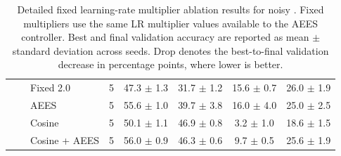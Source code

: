 \begin{table}[htbp]
{\begin{tabular}{lllccccc}
 &  & Fixed 2.0 & 5 & 47.3 $\pm$ 1.3 & 31.7 $\pm$ 1.2 & 15.6 $\pm$ 0.7 & 26.0 $\pm$ 1.9 \\
 &  & AEES & 5 & 55.6 $\pm$ 1.0 & 39.7 $\pm$ 3.8 & 16.0 $\pm$ 4.0 & 25.0 $\pm$ 2.5 \\
 &  & Cosine & 5 & 50.1 $\pm$ 1.1 & 46.9 $\pm$ 0.8 & 3.2 $\pm$ 1.0 & 18.6 $\pm$ 1.5 \\
 &  & Cosine + AEES & 5 & 56.0 $\pm$ 0.9 & 46.3 $\pm$ 0.6 & 9.7 $\pm$ 0.5 & 25.6 $\pm$ 1.9 \\
\bottomrule
\end{tabular}
}
\caption{Detailed fixed learning-rate multiplier ablation results for noisy \cifar{}. Fixed multipliers use the same LR multiplier values available to the AEES controller. Best and final validation accuracy are reported as mean $\pm$ standard deviation across seeds. Drop denotes the best-to-final validation decrease in percentage points, where lower is better.}
\label{tab:cifar_noisy_fixed_lr_ablation_detailed}
\end{table}